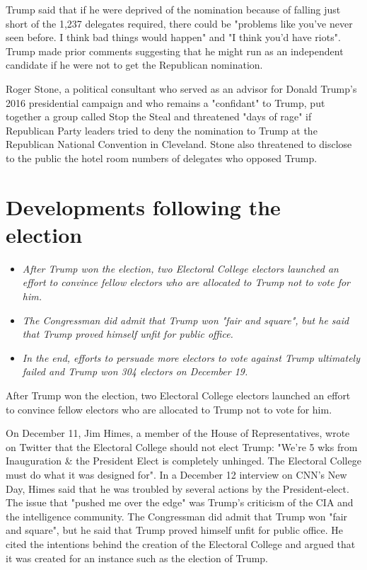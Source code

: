 Trump said that if he were deprived of the nomination because of falling
just short of the 1,237 delegates required, there could be "problems
like you've never seen before. I think bad things would happen" and "I
think you'd have riots". Trump made prior comments suggesting that he
might run as an independent candidate if he were not to get the
Republican nomination.

Roger Stone, a political consultant who served as an advisor for Donald
Trump's 2016 presidential campaign and who remains a "confidant" to
Trump, put together a group called Stop the Steal and threatened "days
of rage" if Republican Party leaders tried to deny the nomination to
Trump at the Republican National Convention in Cleveland. Stone also
threatened to disclose to the public the hotel room numbers of delegates
who opposed Trump.

\section{Developments following the
election}\label{developments-following-the-election}

\begin{itemize}
\item
  \emph{After Trump won the election, two Electoral College electors
  launched an effort to convince fellow electors who are allocated to
  Trump not to vote for him.}
\item
  \emph{The Congressman did admit that Trump won "fair and square", but
  he said that Trump proved himself unfit for public office.}
\item
  \emph{In the end, efforts to persuade more electors to vote against
  Trump ultimately failed and Trump won 304 electors on December 19.}
\end{itemize}

After Trump won the election, two Electoral College electors launched an
effort to convince fellow electors who are allocated to Trump not to
vote for him.

On December 11, Jim Himes, a member of the House of Representatives,
wrote on Twitter that the Electoral College should not elect Trump:
"We're 5 wks from Inauguration \& the President Elect is completely
unhinged. The Electoral College must do what it was designed for". In a
December 12 interview on CNN's New Day, Himes said that he was troubled
by several actions by the President-elect. The issue that "pushed me
over the edge" was Trump's criticism of the CIA and the intelligence
community. The Congressman did admit that Trump won "fair and square",
but he said that Trump proved himself unfit for public office. He cited
the intentions behind the creation of the Electoral College and argued
that it was created for an instance such as the election of Trump.

